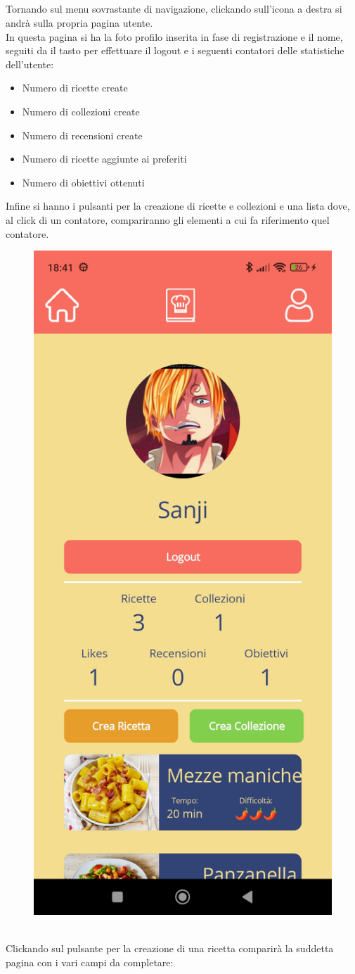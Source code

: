 ﻿\documentclass[a4paper,12pt]{report}
\begin{document}
\\\\\\\\Tornando sul menu sovrastante di navigazione, clickando sull'icona a destra si andrà sulla propria pagina utente.
\\In questa pagina si ha la foto profilo inserita in fase di registrazione e il nome, seguiti da il tasto per effettuare il logout e i seguenti contatori delle statistiche dell'utente:
\begin{itemize}
    \item Numero di ricette create
    \item Numero di collezioni create
    \item Numero di recensioni create
    \item Numero di ricette aggiunte ai preferiti
    \item Numero di obiettivi ottenuti
\end{itemize}
Infine si hanno i pulsanti per la creazione di ricette e collezioni e una lista dove, al click di un contatore, compariranno gli elementi a cui fa riferimento quel contatore.
\begin{figure}[h!]
    \centering
    \includegraphics[width=0.4\linewidth]{app_images/UserPage.jpg}
\end{figure}
\\Clickando sul pulsante per la creazione di una ricetta comparirà la suddetta pagina con i vari campi da completare: 
\end{document}
